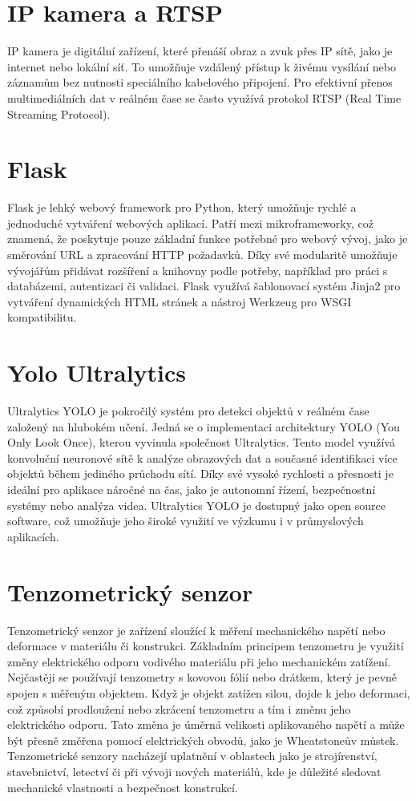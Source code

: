\section*{IP kamera a RTSP}\label{sec:ipcamera-rtsp}
IP kamera je digitální zařízení, které přenáší obraz a zvuk přes IP sítě, jako je internet nebo lokální síť.
To umožňuje vzdálený přístup k živému vysílání nebo záznamům bez nutnosti speciálního kabelového připojení.
Pro efektivní přenos multimediálních dat v reálném čase se často využívá protokol RTSP (Real Time Streaming Protocol).


\section*{Flask}\label{sec:flask}
Flask je lehký webový framework pro Python, který umožňuje rychlé a jednoduché vytváření webových aplikací.
Patří mezi mikroframeworky, což znamená, že poskytuje pouze základní funkce potřebné pro webový vývoj, jako je směrování URL a zpracování HTTP požadavků.
Díky své modularitě umožňuje vývojářům přidávat rozšíření a knihovny podle potřeby, například pro práci s databázemi, autentizaci či validaci.
Flask využívá šablonovací systém Jinja2 pro vytváření dynamických HTML stránek a nástroj Werkzeug pro WSGI kompatibilitu.


\section*{Yolo Ultralytics}\label{sec:yolo-ultralytics}
Ultralytics YOLO je pokročilý systém pro detekci objektů v reálném čase založený na hlubokém učení. Jedná se o implementaci architektury YOLO (You Only Look Once), kterou vyvinula společnost Ultralytics. Tento model využívá konvoluční neuronové sítě k analýze obrazových dat a současné identifikaci více objektů během jediného průchodu sítí. Díky své vysoké rychlosti a přesnosti je ideální pro aplikace náročné na čas, jako je autonomní řízení, bezpečnostní systémy nebo analýza videa. Ultralytics YOLO je dostupný jako open source software, což umožňuje jeho široké využití ve výzkumu i v průmyslových aplikacích.


\section*{Tenzometrický senzor}\label{sec:tenzo}
Tenzometrický senzor je zařízení sloužící k měření mechanického napětí nebo deformace v materiálu či konstrukci. Základním principem tenzometru je využití změny elektrického odporu vodivého materiálu při jeho mechanickém zatížení. Nejčastěji se používají tenzometry s kovovou fólií nebo drátkem, který je pevně spojen s měřeným objektem. Když je objekt zatížen silou, dojde k jeho deformaci, což způsobí prodloužení nebo zkrácení tenzometru a tím i změnu jeho elektrického odporu. Tato změna je úměrná velikosti aplikovaného napětí a může být přesně změřena pomocí elektrických obvodů, jako je Wheatstoneův můstek. Tenzometrické senzory nacházejí uplatnění v oblastech jako je strojírenství, stavebnictví, letectví či při vývoji nových materiálů, kde je důležité sledovat mechanické vlastnosti a bezpečnost konstrukcí.


